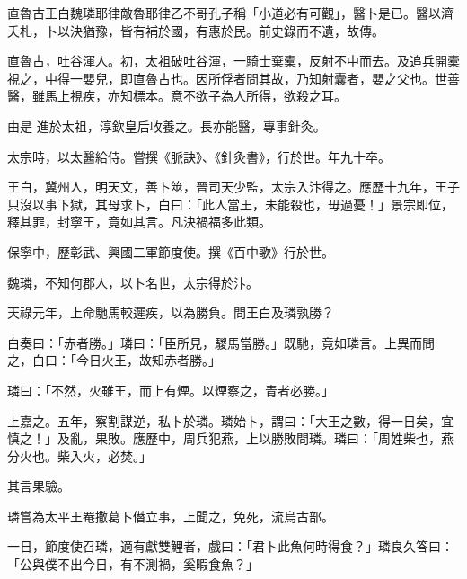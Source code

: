 
\begin{pinyinscope}

 直魯古王白魏璘耶律敵魯耶律乙不哥孔子稱「小道必有可觀」，醫卜是已。醫以濟夭札，卜以決猶豫，皆有補於國，有惠於民。前史錄而不遺，故傳。



 直魯古，吐谷渾人。初，太祖破吐谷渾，一騎士棄橐，反射不中而去。及追兵開橐視之，中得一嬰兒，即直魯古也。因所俘者問其故，乃知射囊者，嬰之父也。世善醫，雖馬上視疾，亦知標本。意不欲子為人所得，欲殺之耳。



 由是
 進於太祖，淳欽皇后收養之。長亦能醫，專事針灸。



 太宗時，以太醫給侍。嘗撰《脈訣》、《針灸書》，行於世。年九十卒。



 王白，冀州人，明天文，善卜筮，晉司天少監，太宗入汴得之。應歷十九年，王子只沒以事下獄，其母求卜，白曰：「此人當王，未能殺也，毋過憂！」景宗即位，釋其罪，封寧王，竟如其言。凡決禍福多此類。



 保寧中，歷彰武、興國二軍節度使。撰《百中歌》行於世。



 魏璘，不知何郡人，以卜名世，太宗得於汴。



 天祿元年，上命馳馬較遲疾，以為勝負。問王白及璘孰勝？



 白奏曰：「赤者勝。」璘曰：「臣所見，騣馬當勝。」既馳，竟如璘言。上異而問
 之，白曰：「今日火王，故知赤者勝。」



 璘曰：「不然，火雖王，而上有煙。以煙察之，青者必勝。」



 上嘉之。五年，察割謀逆，私卜於璘。璘始卜，謂曰：「大王之數，得一日矣，宜慎之！」及亂，果敗。應歷中，周兵犯燕，上以勝敗問璘。璘曰：「周姓柴也，燕分火也。柴入火，必焚。」



 其言果驗。



 璘嘗為太平王罨撒葛卜僭立事，上聞之，免死，流烏古部。



 一日，節度使召璘，適有獻雙鯉者，戲曰：「君卜此魚何時得食？」璘良久答曰：「公與僕不出今日，有不測禍，奚暇食魚？」




\end{pinyinscope}
